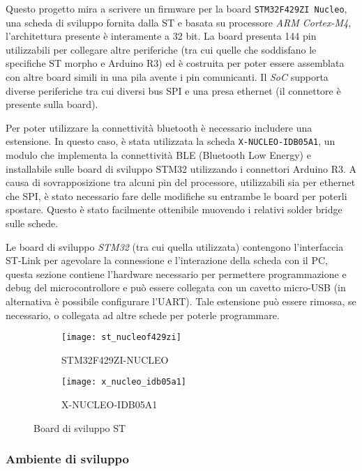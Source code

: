 
Questo progetto mira a scrivere un firmware per la board \texttt{STM32F429ZI Nucleo}, una scheda di sviluppo fornita dalla ST e basata su processore \textit{ARM Cortex-M4}, l'architettura presente \`e interamente a 32 bit. La board presenta 144 pin utilizzabili per collegare altre periferiche (tra cui quelle che soddisfano le specifiche ST morpho e Arduino R3) ed \`e costruita per poter essere assemblata con altre board simili in una pila avente i pin comunicanti. Il \textit{SoC} supporta diverse periferiche tra cui diversi bus SPI e una presa ethernet (il connettore \`e presente sulla board).

Per poter utilizzare la connettivit\`a bluetooth \`e necessario includere una estensione. In questo caso, \`e stata utilizzata la scheda \texttt{X-NUCLEO-IDB05A1}, un modulo che implementa la connettivit\`a BLE (Bluetooth Low Energy) e installabile sulle board di sviluppo STM32 utilizzando i connettori Arduino R3. A causa di sovrapposizione tra alcuni pin del processore, utilizzabili sia per ethernet che SPI, \`e stato necessario fare delle modifiche su entrambe le board per poterli spostare. Questo \`e stato facilmente ottenibile muovendo i relativi solder bridge sulle schede.

Le board di sviluppo \textit{STM32} (tra cui quella utilizzata) contengono l'interfaccia ST-Link per agevolare la connessione e l'interazione della scheda con il PC, questa sezione contiene l'hardware necessario per permettere programmazione e debug del microcontrollore e pu\`o essere collegata con un cavetto micro-USB (in alternativa \`e possibile configurare l'UART). Tale estensione pu\`o essere rimossa, se necessario, o collegata ad altre schede per poterle programmare.

\begin{figure}[ht]
  \center
  \begin{subfigure}{.45\textwidth}
    \texttt{[image: st\_nucleof429zi]}
    \caption{STM32F429ZI-NUCLEO}
  \end{subfigure}
  \hfill
  \begin{subfigure}{.45\textwidth}
    \texttt{[image: x\_nucleo\_idb05a1]}
    \caption{X-NUCLEO-IDB05A1}
  \end{subfigure}
  \caption{Board di sviluppo ST}
  \label{fig:boards}
\end{figure}

\subsubsection{Ambiente di sviluppo}

